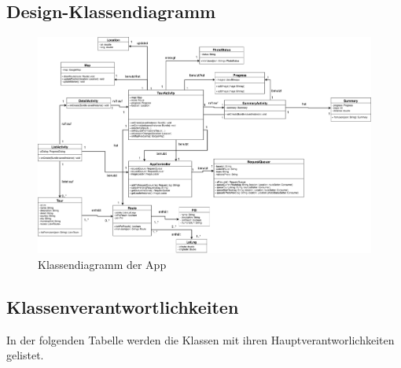 \documentclass[a4paper,10pt,xetex]{article}
\begin{document}
\subsection{Design-Klassendiagramm}\label{design-klassendiagram}
\begin{figure}
  \includegraphics{classdiagram_frontend}
  \caption{Klassendiagramm der App}
\end{figure}

\subsection{Klassenverantwortlichkeiten}\label{klassenverantwortlichkeiten}
In der folgenden Tabelle werden die Klassen mit ihren Hauptverantworlichkeiten
gelistet.
\end{document}
